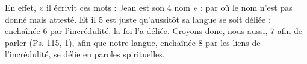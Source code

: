 En effet, « il écrivit ces mots : Jean est son	 
4	 	nom » : par où le nom n'est pas donné mais attesté. Et il	 
5	 	est juste qu'aussitôt sa langue se soit déliée : enchaînée	 
6	 	par l'incrédulité, la foi l'a déliée. Croyons donc, nous aussi,	 
7	 	afin de parler (Ps. 115, 1), afin que notre langue, enchaînée	 
8	 	par les liens de l'incrédulité, se délie en paroles spirituelles.
